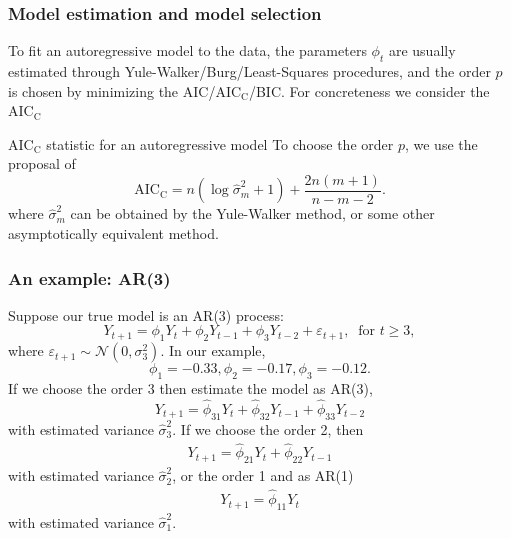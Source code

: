 \documentclass{beamer}
\begin{document}
\begin{frame}
\frametitle{Model estimation and model selection}
To fit an autoregressive model to the data, the parameters $\phi_t$ are usually estimated through Yule-Walker/Burg/Least-Squares procedures, and the order $p$ is chosen by minimizing the AIC/$\mathrm{AIC_C}$/BIC. For concreteness we consider the $\mathrm{AIC_C}$\\

\begin{block}{$\mathrm{AIC_C}$ statistic for an autoregressive model}
  To choose the order $p$, we use the proposal of \cite{AICC}
\begin{equation}\label{eq:AICCCliff}
\mathrm{AIC_C}=n(\log\widehat{\sigma}_m^2+1)+\dfrac{2n(m+1)}{n-m-2}.
\end{equation}
where $\widehat{\sigma}_m^2$ can be obtained by the Yule-Walker method, or some other asymptotically equivalent method.
\end{block}
\end{frame}



\begin{frame}
\frametitle{An example: AR(3)}
Suppose our true model is an AR(3) process: 
\begin{equation*}
Y_{t+1}=\phi_1Y_{t}+\phi_2Y_{t-1}+\phi_3Y_{t-2}+\varepsilon_{t+1}, \;\;\text{for }t\ge3,
\end{equation*}
where $\varepsilon_{t+1}\sim\mathcal{N}(0,\sigma_3^2)$. In our example, 
\begin{equation*}
\phi_1 = -0.33, \phi_2 = -0.17, \phi_3 = -0.12.
\end{equation*}
If we choose the order 3 then estimate the model as AR(3),
\begin{equation*}
Y_{t+1}=\widehat{\phi}_{31}Y_{t}+\widehat{\phi}_{32}Y_{t-1}+\widehat{\phi}_{33}Y_{t-2}
\end{equation*}
with estimated variance $\widehat{\sigma}_3^2$. If we choose the order 2, then
\begin{align*}
Y_{t+1}=\widehat{\phi}_{21}Y_{t}+\widehat{\phi}_{22}Y_{t-1}
\end{align*}
with estimated variance $\widehat{\sigma}_2^2$, or the order 1 and as AR(1)
\begin{align*}
Y_{t+1}=\widehat{\phi}_{11}Y_{t}
\end{align*}
with estimated variance $\widehat{\sigma}_1^2$.
\end{frame}
\end{document}
